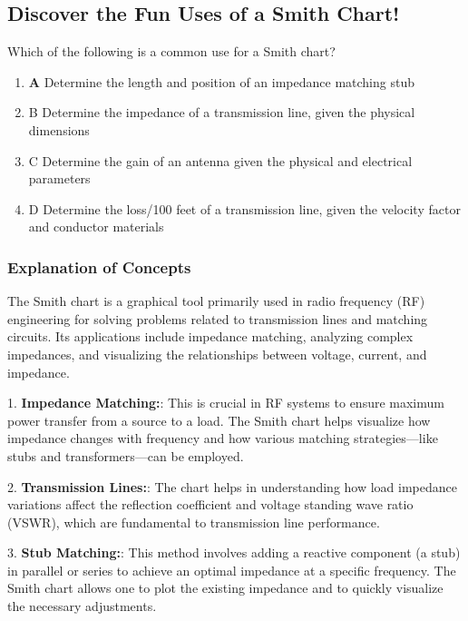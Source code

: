 \subsection{Discover the Fun Uses of a Smith Chart!}

\begin{tcolorbox}[colback=gray!10, colframe=black, title=E9G05]

Which of the following is a common use for a Smith chart? 
\begin{enumerate}[label=\Alph*)]
    \item \textbf{A} Determine the length and position of an impedance matching stub
    \item B Determine the impedance of a transmission line, given the physical dimensions
    \item C Determine the gain of an antenna given the physical and electrical parameters
    \item D Determine the loss/100 feet of a transmission line, given the velocity factor and conductor materials
\end{enumerate} \end{tcolorbox}

\subsubsection{Explanation of Concepts}

The Smith chart is a graphical tool primarily used in radio frequency (RF) engineering for solving problems related to transmission lines and matching circuits. Its applications include impedance matching, analyzing complex impedances, and visualizing the relationships between voltage, current, and impedance.

1. \textbf{Impedance Matching:}: This is crucial in RF systems to ensure maximum power transfer from a source to a load. The Smith chart helps visualize how impedance changes with frequency and how various matching strategies—like stubs and transformers—can be employed.

2. \textbf{Transmission Lines:}: The chart helps in understanding how load impedance variations affect the reflection coefficient and voltage standing wave ratio (VSWR), which are fundamental to transmission line performance.

3. \textbf{Stub Matching:}: This method involves adding a reactive component (a stub) in parallel or series to achieve an optimal impedance at a specific frequency. The Smith chart allows one to plot the existing impedance and to quickly visualize the necessary adjustments.


